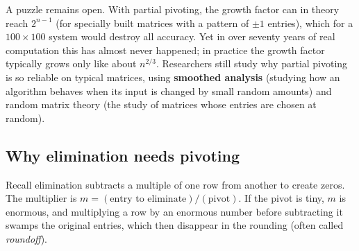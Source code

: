 \begin{historybox}
A puzzle remains open. With partial pivoting, the growth factor can in theory reach
$2^{n-1}$ (for specially built matrices with a pattern of $\pm1$ entries), which for a
$100 \times 100$ system would destroy all accuracy. Yet in over seventy years of real
computation this has almost never happened; in practice the growth factor typically
grows only like about $n^{2/3}$. Researchers still study why partial pivoting is so
reliable on typical matrices, using \textbf{smoothed analysis} (studying how an algorithm
behaves when its input is changed by small random amounts) and random matrix theory (the
study of matrices whose entries are chosen at random).
\end{historybox}

\subsection{Why elimination needs pivoting}

Recall elimination subtracts a multiple of one row from another to create zeros. The
multiplier is $m = (\text{entry to eliminate})/(\text{pivot})$. If the pivot is tiny,
$m$ is enormous, and multiplying a row by an enormous number before subtracting it
swamps the original entries, which then disappear in the rounding (often called
\emph{roundoff}).


